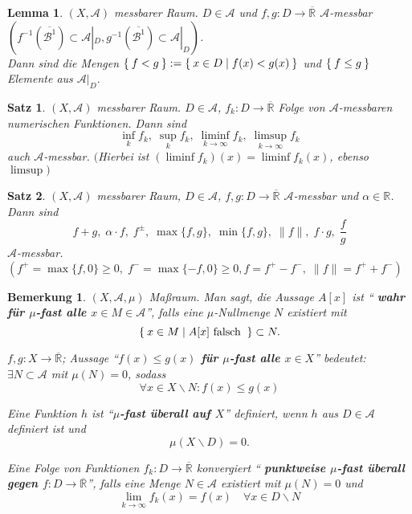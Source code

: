 \documentclass[11pt]{memoir}
\theoremstyle{changebreak}
\newtheorem{Bemerkung}{Bemerkung}[chapter]
\newtheorem{Lemma}{Lemma}[chapter]
\newtheorem{Satz}{Satz}[chapter]
\newcommand{\quotes}[1]{``#1''}
\begin{document}
\begin{Lemma}
$(X, \mathscr A)$ messbarer Raum. $D \in \mathscr A$ und $f, g: D \rightarrow \overline{\mathbb R }$ $\mathscr A$-messbar \\
$ \left( f^{-1}(\overline{\mathscr{B}^1}) \subset \mathscr A |_D, g^{-1}(\overline{\mathscr{B}^1}) \subset \mathscr A |_D\right)$. \\ Dann sind die Mengen $\Set{f < g}:= \Set{x \in D | f(x) < g(x)}$ und $\Set{f \leq g}$ Elemente aus $\mathscr A |_D$.
\end{Lemma}

\begin{Satz}
$(X, \mathscr A)$ messbarer Raum. $D \in \mathscr A$, $f_k: D \rightarrow \overline{\mathbb R}$ Folge von $\mathscr A$-messbaren numerischen Funktionen. 
Dann sind $$\inf\limits_k f_k,\; \sup\limits_k f_k,\; \liminf\limits_{k\rightarrow \infty} f_k,\; \limsup\limits_{k \rightarrow \infty} f_k$$ auch $\mathscr A$-messbar. 
$($Hierbei ist $(\liminf f_k)(x) = \liminf f_k(x)$, ebenso $\limsup)$
\end{Satz}

\begin{Satz}
$(X, \mathscr A)$ messbarer Raum, $D \in \mathscr A$, $f, g: D \rightarrow \overline{\mathbb R }$ $\mathscr A$-messbar und $\alpha \in \mathbb R$. 
Dann sind 
$$f+g, \;\alpha \cdotp f, \;f^\pm,\; \max{\{f, g\}}, \;\min{\{f, g\}},\; \|f\|, \;f \cdotp g, \;\dfrac{f}{g}$$ $\mathscr A$-messbar. \\
$\left( f^+ = \max{\{f, 0\}} \geq 0, \;f^- = \max{\{-f, 0\}} \geq 0, f = f^+ - f^-, \; \|f\| = f^+ + f^- \right)$
\end{Satz}

\begin{Bemerkung}
$(X, \mathscr A, \mu)$ Maßraum. Man sagt, die Aussage $A[x]$ ist \quotes{ \textbf{wahr für \textbf{$\mu$-fast alle $x \in M \in \mathscr A$}}}, falls eine $\mu$-Nullmenge $N$ existiert mit 
$$\Set{x \in M| A[x]  \text{  falsch }} \subset N.$$

$f, g: X \rightarrow \overline{\mathbb R}$; \quad Aussage  \quotes{\textbf{$f(x) \leq g(x)$ für $\mu$-fast alle $x \in X$}}  bedeutet: \\
$\exists N \subset \mathscr A$ mit $\mu(N) = 0$, sodass 
$$\forall x \in X\backslash N: f(x) \leq g(x)$$

Eine Funktion $h$ ist \quotes{\textbf{$\mu$-fast überall auf $X$}} definiert, wenn $h$ aus $D \in \mathscr A$ definiert ist und 
$$\mu(X \backslash D) = 0.$$

Eine Folge von Funktionen $f_k: D \rightarrow \overline{\mathbb R}$ konvergiert \quotes{ \textbf{punktweise $\mu$-fast überall gegen $f: D \rightarrow \overline{\mathbb R}$}}, falls eine Menge $N \in \mathscr A$ existiert mit $\mu(N) = 0$ und $$\lim\limits_ {k \rightarrow \infty} f_k(x) = f(x)\quad \forall x \in D \backslash N$$
\end{Bemerkung}
\end{document}
